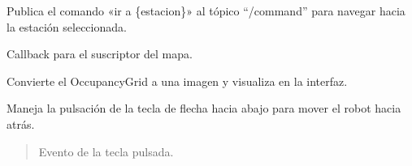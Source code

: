 \documentclass[a4paper,10pt,spanish]{sphinxmanual}
\begin{document}
\begin{fulllineitems}

\begin{fulllineitems}
\label{\detokenize{squad_state_manager:squad_interfaz.InterfazManager.go_to_station}}
\pysigstartsignatures
{}
\pysigstopsignatures
\sphinxAtStartPar
Publica el comando «ir a \{estacion\}» al tópico “/command” para navegar hacia la estación seleccionada.

\end{fulllineitems}


\begin{fulllineitems}
\label{\detokenize{squad_state_manager:squad_interfaz.InterfazManager.map_callback}}
\pysigstartsignatures
{}
\pysigstopsignatures
\sphinxAtStartPar
Callback para el suscriptor del mapa.

\sphinxAtStartPar
Convierte el OccupancyGrid a una imagen y visualiza en la interfaz.

\end{fulllineitems}


\begin{fulllineitems}
\label{\detokenize{squad_state_manager:squad_interfaz.InterfazManager.on_arrow_down}}
\pysigstartsignatures
{}
\pysigstopsignatures
\sphinxAtStartPar
Maneja la pulsación de la tecla de flecha hacia abajo para mover el robot hacia atrás.
\begin{quote}\begin{description}
\sphinxAtStartPar
{} \textendash{} Evento de la tecla pulsada.

\end{description}\end{quote}


\end{fulllineitems}
\end{fulllineitems}
\end{document}
